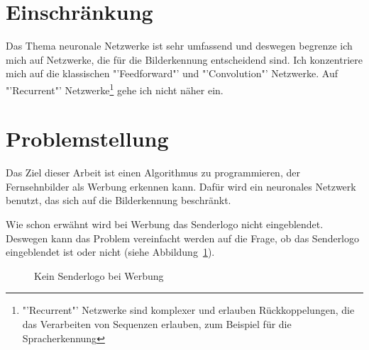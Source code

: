 \documentclass[12pt,a4paper]{report}
\begin{document}
\section{Einschränkung}
Das Thema neuronale Netzwerke ist sehr umfassend und deswegen begrenze ich mich auf Netzwerke, die für die Bilderkennung entscheidend sind.
Ich konzentriere mich auf die klassischen "'Feedforward"' und "'Convolution"' Netzwerke.
Auf "'Recurrent"' Netzwerke\footnote{
"'Recurrent"' Netzwerke sind komplexer und erlauben Rückkoppelungen, die das Verarbeiten von Sequenzen erlauben, zum Beispiel für die Spracherkennung\cite{wiki:rnn}
} gehe ich nicht näher ein.

\section{Problemstellung}\label{sec:problemstellung}
Das Ziel dieser Arbeit ist einen Algorithmus zu programmieren, der Fernsehnbilder als Werbung erkennen kann.
Dafür wird ein neuronales Netzwerk benutzt, das sich auf die Bilderkennung beschränkt.

Wie schon erwähnt wird bei Werbung das Senderlogo nicht eingeblendet.
Deswegen kann das Problem vereinfacht werden auf die Frage,
ob das Senderlogo eingeblendet ist oder nicht (siehe Abbildung~\ref{fig:logo1}).
\begin{figure}[h]%
    \centering
    \qquad
    \caption{Kein Senderlogo bei Werbung}%
    \label{fig:logo1}%
\end{figure}
\end{document}
